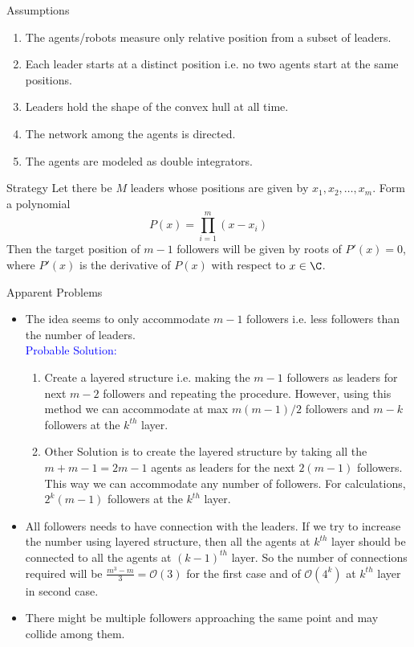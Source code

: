 	
	\begin{frame}{}
		\begin{block}{Assumptions}
			\begin{enumerate}
				\item The agents/robots measure only relative position from a subset of leaders.
				\item Each leader starts at a distinct position i.e. no two agents start at the same positions.
				\item Leaders hold the shape of the convex hull at all time.
				\item The network among the agents is directed.
				\item The agents are modeled as double integrators.
			\end{enumerate}
		\end{block}
		\begin{alertblock}{Strategy}
			Let there be $M$ leaders whose positions are given by $x_1,x_2,\dots,x_m$. Form a polynomial $$P(x)=\prod_{i=1}^{m}(x-x_i)$$
			Then the target position of $m-1$ followers will be given by roots of $P'(x)=0$, where $P'(x)$ is the derivative of $P(x)$ with respect to $x \in \C$.\\
		\end{alertblock}
	\end{frame}
	
	\begin{frame}{Apparent Problems}
		\begin{itemize}
			\item The idea seems to only accommodate $m-1$ followers i.e. less followers than the number of leaders. \\
			\textcolor{blue}{ Probable Solution:} 
			\begin{enumerate}
				\item Create a layered structure i.e. making the $m-1$ followers as leaders for next $m-2$ followers and repeating the procedure. However, using this method we can accommodate at max  $m(m-1)/2$ followers and $m-k$ followers at the $k^{th}$ layer.
				\item Other Solution is to create the layered structure by taking all the $m+m-1=2m-1$ agents as leaders for the next $2(m-1)$ followers. This way we can accommodate any number of followers. For calculations, $2^k(m-1)$ followers at the $k^{th}$ layer. 
			\end{enumerate}
			\item All followers needs to have connection with the leaders. If we try to increase the number using layered structure, then all the agents at $k^{th}$ layer should be connected to all the agents at $(k-1)^{th}$ layer. So the number of connections required will be $\frac{m^3-m}{3}=\mathcal{O}(3)$ for the first case and of $\mathcal{O}(4^k)$ at $k^{th}$ layer in second case. 
			\item There might be multiple followers approaching the same point and may collide among them.
		\end{itemize}
	\end{frame}
	

